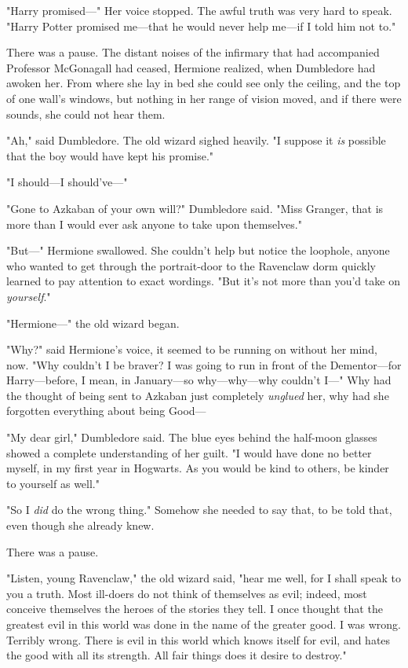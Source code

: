 "Harry promised---" Her voice stopped. The awful truth was very hard to speak. 
"Harry Potter promised me---that he would never help me---if I told him not to."

There was a pause. The distant noises of the infirmary that had accompanied 
Professor McGonagall had ceased, Hermione realized, when Dumbledore had awoken 
her. From where she lay in bed she could see only the ceiling, and the top of 
one wall's windows, but nothing in her range of vision moved, and if there were 
sounds, she could not hear them.

"Ah," said Dumbledore. The old wizard sighed heavily. "I suppose it \emph{is} 
possible that the boy would have kept his promise."

"I should---I should've---"

"Gone to Azkaban of your own will?" Dumbledore said. "Miss Granger, that is 
more than I would ever ask anyone to take upon themselves."

"But---" Hermione swallowed. She couldn't help but notice the loophole, anyone 
who wanted to get through the portrait-door to the Ravenclaw dorm quickly 
learned to pay attention to exact wordings. "But it's not more than you'd take 
on \emph{yourself}."

"Hermione---" the old wizard began.

"Why?" said Hermione's voice, it seemed to be running on without her mind, now. 
"Why couldn't I be braver? I was going to run in front of the Dementor---for 
Harry---before, I mean, in January---so why---why---why couldn't I---" Why had 
the thought of being sent to Azkaban just completely \emph{unglued} her, why 
had she forgotten everything about being Good---

"My dear girl," Dumbledore said. The blue eyes behind the half-moon glasses 
showed a complete understanding of her guilt. "I would have done no better 
myself, in my first year in Hogwarts. As you would be kind to others, be kinder 
to yourself as well."

"So I \emph{did} do the wrong thing." Somehow she needed to say that, to be 
told that, even though she already knew.

There was a pause.

"Listen, young Ravenclaw," the old wizard said, "hear me well, for I shall 
speak to you a truth. Most ill-doers do not think of themselves as evil; 
indeed, most conceive themselves the heroes of the stories they tell. I once 
thought that the greatest evil in this world was done in the name of the 
greater good. I was wrong. Terribly wrong. There is evil in this world which 
knows itself for evil, and hates the good with all its strength. All fair 
things does it desire to destroy."

